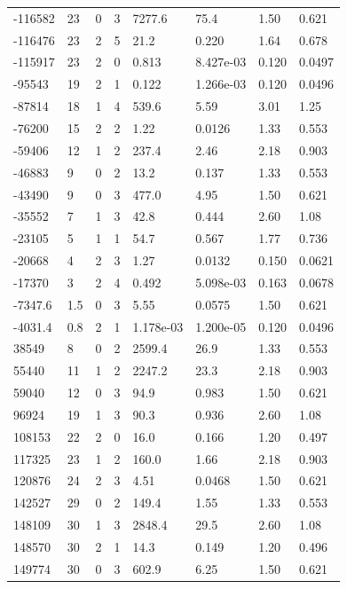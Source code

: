 \documentclass[preview]{standalone}
\begin{document}
{{\begin{tabular}{L{1.2cm}C{1.2cm} C{0.3cm}C{0.5cm} C{1.4cm}C{1.4cm} C{1.4cm}C{1.4cm}}
  -116582  &    23  & 0     &  3 &  7277.6  & 75.4  & 1.50 &  0.621   \\ 
  -116476  &    23  & 2     &  5 &  21.2  & 0.220  & 1.64 &  0.678   \\ 
  -115917  &    23  & 2     &  0 &  0.813  & 8.427e-03  & 0.120 &  0.0497   \\ 
  -95543  &    19  & 2     &  1 &  0.122  & 1.266e-03  & 0.120 &  0.0496   \\ 
  -87814  &    18  & 1     &  4 &  539.6  & 5.59  & 3.01 &  1.25   \\ 
  -76200  &    15  & 2     &  2 &  1.22  & 0.0126  & 1.33 &  0.553   \\ 
  -59406  &    12  & 1     &  2 &  237.4  & 2.46  & 2.18 &  0.903   \\ 
  -46883  &     9  & 0     &  2 &  13.2  & 0.137  & 1.33 &  0.553   \\ 
  -43490  &     9  & 0     &  3 &  477.0  & 4.95  & 1.50 &  0.621   \\ 
  -35552  &     7  & 1     &  3 &  42.8  & 0.444  & 2.60 &  1.08   \\ 
  -23105  &     5  & 1     &  1 &  54.7  & 0.567  & 1.77 &  0.736   \\ 
  -20668  &     4  & 2     &  3 &  1.27  & 0.0132  & 0.150 &  0.0621   \\ 
  -17370  &     3  & 2     &  4 &  0.492  & 5.098e-03  & 0.163 &  0.0678   \\ 
  -7347.6  &   1.5  & 0     &  3 &  5.55  & 0.0575  & 1.50 &  0.621   \\ 
  -4031.4  &   0.8  & 2     &  1 &  1.178e-03  & 1.200e-05  & 0.120 &  0.0496   \\ 
  38549  &     8  & 0     &  2 &  2599.4  & 26.9  & 1.33 &  0.553   \\ 
  55440  &    11  & 1     &  2 &  2247.2  & 23.3  & 2.18 &  0.903   \\ 
  59040  &    12  & 0     &  3 &  94.9  & 0.983  & 1.50 &  0.621   \\ 
  96924  &    19  & 1     &  3 &  90.3  & 0.936  & 2.60 &  1.08   \\ 
  108153  &    22  & 2     &  0 &  16.0  & 0.166  & 1.20 &  0.497   \\ 
  117325  &    23  & 1     &  2 &  160.0  & 1.66  & 2.18 &  0.903   \\ 
  120876  &    24  & 2     &  3 &  4.51  & 0.0468  & 1.50 &  0.621   \\ 
  142527  &    29  & 0     &  2 &  149.4  & 1.55  & 1.33 &  0.553   \\ 
  148109  &    30  & 1     &  3 &  2848.4  & 29.5  & 2.60 &  1.08   \\ 
  148570  &    30  & 2     &  1 &  14.3  & 0.149  & 1.20 &  0.496   \\ 
  149774  &    30  & 0     &  3 &  602.9  & 6.25  & 1.50 &  0.621   \\ 
\hline 
\end{tabular} 

}}
\end{document}
